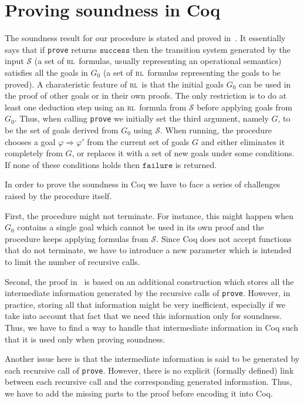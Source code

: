 \documentclass[10pt,a4wide]{article}
\newcommand{\Ra}{\Rightarrow}
\newcommand{\rrule}[2]{{#1} \Ra{#2}}
\newcommand{\RL}{\textsc{rl}~}
\renewcommand{\S}{\mathcal{S}}
\newcommand{\failure}{\mathtt{failure}}
\newcommand{\success}{\mathtt{success}}
\begin{document}
\section{Proving soundness in Coq}

The soundness result for our procedure is stated and proved in~\cite{vrlprls}. 
It essentially says that if \texttt{prove} returns $\success$ then the transition system generated by the input $\S$ (a set of \RL formulas, usually representing an operational semantics) satisfies all the goals in $G_0$ (a set of \RL formulas representing the goals to be proved). 
A charateristic feature of \RL is that the initial goals $G_0$ can be used in the proof of other goals or in their own proofs.
The only restriction is to do at least one deduction step using an \RL formula from $\S$ before applying goals from $G_0$.
Thus, when calling \texttt{prove} we initially set the third argument, namely $G$, to be the set of goals derived from $G_0$ using $\S$.
When running, the procedure chooses a goal $\rrule{\varphi}{\varphi'}$ from the current set of goals $G$ and either eliminates it completely from $G$, or replaces it with a set of new goals under some conditions.  
If none of these conditions holds then $\failure$ is returned.

In order to prove the soundness in Coq we have to face a series of challenges raised by the procedure itself. 

First, the procedure might not terminate. 
For instance, this might happen when $G_0$ contains a single goal which cannot be used in its own proof and the procedure keeps applying formulas from $\S$.
Since Coq does not accept functions that do not terminate, we have to introduce a new parameter which is intended to limit the number of recursive calls.

Second, the proof in~\cite{vrlprls} is based on an additional construction which stores all the intermediate information generated by the recursive calls of \texttt{prove}. 
However, in practice, storing all that information might be very inefficient, especially if we take into account that fact that we need this information only for soundness. 
Thus, we have to find a way to handle that intermediate information in Coq such that it is used only when proving soundness.

Another issue here is that the intermediate information is said to be generated by each recursive call of \texttt{prove}. However, there is no explicit (formally defined) link between each recursive call and the corresponding generated information. Thus, we have to add the missing parts to the proof before encoding it into Coq. 
\end{document}
